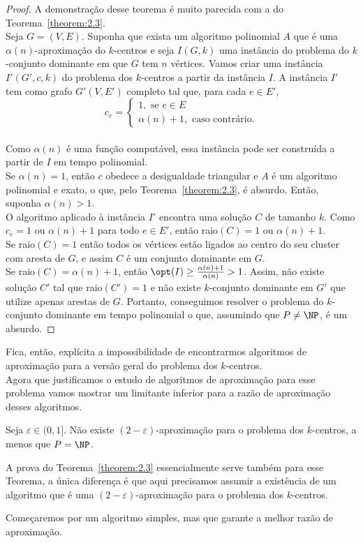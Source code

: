 \begin{proof}
        A demonstração desse teorema é muito parecida com a do Teorema~\ref{theorem:2.3}. \\
        Seja $G = (V,E)$. Suponha que exista um algoritmo polinomial $A$ que é uma $\alpha(n)$-aproximação do $k$-centros e seja $I(G,k)$ uma instância do problema do $k$-conjunto dominante em que $G$ tem $n$ vértices. Vamos criar uma instância $I'(G',c,k)$ do problema dos $k$-centros a partir da instância $I$. A instância $I'$ tem como grafo $G'(V,E')$ completo tal que, para cada $e \in E'$, \\
    \[c_e = \begin{cases}
            1, \text{ se } e \in E \\
            \alpha(n)+1, \text{ caso contrário.} 
            \end{cases}\]\\
    Como $\alpha(n)$ é uma função computável, essa instância pode ser construída a partir de $I$ em tempo polinomial. \\
    Se $\alpha(n)=1$, então $c$ obedece a desigualdade triangular e $A$ é um algoritmo polinomial e exato, o que, pelo Teorema~\ref{theorem:2.3}, é absurdo. Então, suponha $\alpha(n)>1$. \\
    O algoritmo aplicado à instância $I'$ encontra uma solução $C$ de tamanho $k$. Como $c_e = 1$ ou $\alpha(n)+1$ para todo $e \in E'$, então raio$(C)=1$ ou $\alpha(n)+1$.\\
    Se raio$(C)=1$ então todos os vértices estão ligados ao centro do seu cluster com aresta de $G$, e assim $C$ é um conjunto dominante em $G$. \\
    Se raio$(C) = \alpha(n) + 1$, então $\opt(I) \geq \frac{\alpha(n)+1}{\alpha(n)}>1$. Assim, não existe solução $C'$ tal que raio$(C')=1$ e não existe $k$-conjunto dominante em $G'$ que utilize apenas arestas de $G$.
    Portanto, conseguimos resolver o problema do $k$-conjunto dominante em tempo polinomial o que, assumindo que $P \neq \NP$, é um absurdo.
\end{proof}
    Fica, então, explícita a impossibilidade de encontrarmos algoritmos de aproximação para a versão geral do problema dos $k$-centros.\\
    Agora que justificamos o estudo de algoritmos de aproximação para esse problema vamos mostrar um limitante inferior para a razão de aproximação desses algoritmos.
    
    \begin{theorem}
        Seja $\varepsilon \in (0,1]$. Não existe $(2-\varepsilon)$-aproximação para o problema dos $k$-centros, a menos que $P=\NP$.
    \end{theorem}
    A prova do Teorema~\ref{theorem:2.3} essencialmente serve também para esse Teorema, a única diferença é que aqui precisamos assumir a existência de um algoritmo que é uma $(2 - \varepsilon)$-aproximação para o problema dos $k$-centros.

    Começaremos por um algoritmo simples, mas que garante a melhor razão de aproximação.